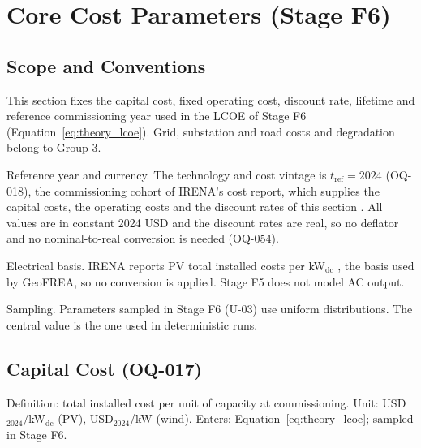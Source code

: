 
\section{Core Cost Parameters (Stage F6)}
\label{sec:params_group2}

\subsection{Scope and Conventions}
\label{subsec:g2_scope}

This section fixes the capital cost, fixed operating cost, discount rate,
lifetime and reference commissioning year used in the LCOE of Stage F6
(Equation~\ref{eq:theory_lcoe}). Grid, substation and road costs and
degradation belong to Group 3.

Reference year and currency. The technology and cost vintage is
$t_{\mathrm{ref}}=2024$ (OQ-018), the commissioning cohort of IRENA's
cost report, which supplies the capital costs, the operating costs and
the discount rates of this section \cite{irena2025costs2024}. All values
are in constant 2024 USD and the discount rates are real, so no deflator
and no nominal-to-real conversion is needed (OQ-054).

Electrical basis. IRENA reports PV total installed costs per
kW$_{\mathrm{dc}}$ \cite{irena2025costs2024}, the basis used by GeoFREA,
so no conversion is applied. Stage F5 does not model AC output.

Sampling. Parameters sampled in Stage F6 (U-03) use uniform
distributions. The central value is the one used in deterministic runs.

\subsection{Capital Cost (OQ-017)}
\label{subsec:g2_capex}

Definition: total installed cost per unit of capacity at commissioning.
Unit: USD$_{2024}$/kW$_{\mathrm{dc}}$ (PV), USD$_{2024}$/kW (wind).
Enters: Equation~\ref{eq:theory_lcoe}; sampled in Stage F6.


